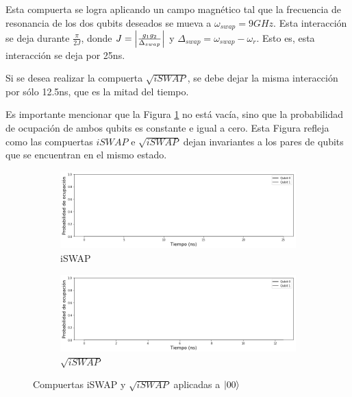 Esta compuerta se logra aplicando un campo magnético tal que la frecuencia de resonancia de los dos qubits deseados se mueva a $\omega_{swap} = 9GHz$. Esta interacción se deja durante $\frac{\pi}{2 J}$, donde $J = \abs{\frac{g_1 g_2}{\Delta_{swap}}}$ y $\Delta_{swap} = \omega_{swap} - \omega_r$. Esto es, esta interacción se deja por 25ns.

Si se desea realizar la compuerta $\sqrt{iSWAP}$, se debe dejar la misma interacción por sólo 12.5ns, que es la mitad del tiempo.

Es importante mencionar que la Figura \ref{fig:iswapsqrtiswap00} no está vacía, sino que la probabilidad de ocupación de ambos qubits es constante e igual a cero. Esta Figura refleja como las compuertas $iSWAP$ e $\sqrt{iSWAP}$ dejan invariantes a los pares de qubits que se encuentran en el mismo estado.

\begin{figure}[H]
    \centering
    \begin{subfigure}[m]{0.49\textwidth}
        \centering \includegraphics[width=1\linewidth]{img/iswap00.png}
        \caption{iSWAP}
    \end{subfigure}
    \begin{subfigure}[m]{0.49\textwidth}
        \centering \includegraphics[width=1\linewidth]{img/sqrtiswap00.png}
        \caption{$\sqrt{iSWAP}$}
    \end{subfigure}
    \caption[Compuertas iSWAP y $\sqrt{iSWAP}$ aplicadas a $\ket{00}$]{Compuertas iSWAP y $\sqrt{iSWAP}$ aplicadas a $\ket{00}$}
\label{fig:iswapsqrtiswap00}
\end{figure}

